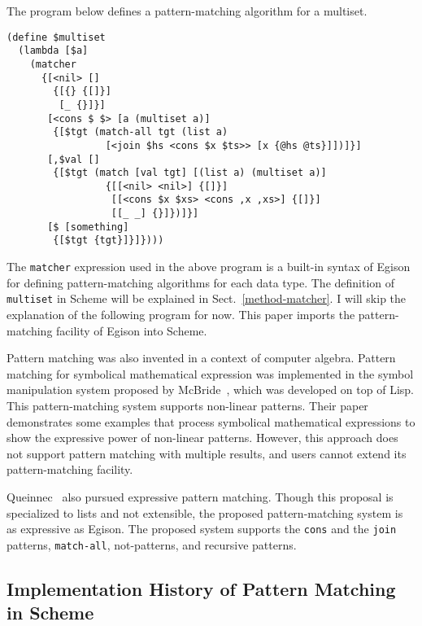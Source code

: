 \documentclass[acmlarge]{acmart}
\newcommand{\todo}[1]{\textcolor{red}{(TODO: #1)}}
\newcommand{\new}[1]{\textcolor{blue}{#1}}
\begin{document}
The program below defines a pattern-matching algorithm for a multiset.

\begin{lstlisting}[language=egison]
(define $multiset
  (lambda [$a]
    (matcher
      {[<nil> []
        {[{} {[]}]
         [_ {}]}]
       [<cons $ $> [a (multiset a)]
        {[$tgt (match-all tgt (list a)
                 [<join $hs <cons $x $ts>> [x {@hs @ts}]])]}]
       [,$val []
        {[$tgt (match [val tgt] [(list a) (multiset a)]
                 {[[<nil> <nil>] {[]}]
                  [[<cons $x $xs> <cons ,x ,xs>] {[]}]
                  [[_ _] {}]})]}]
       [$ [something]
        {[$tgt {tgt}]}]})))
\end{lstlisting}

\noindent
The \lstinline{matcher} expression used in the above program is a built-in syntax of Egison for defining pattern-matching algorithms for each data type.
The definition of \lstinline{multiset} in Scheme will be explained in Sect.~\ref{method-matcher}.
I will skip the explanation of the following program for now.
This paper imports the pattern-matching facility of Egison into Scheme.

\medskip

Pattern matching was also invented in a context of computer algebra.
Pattern matching for symbolical mathematical expression was implemented in the symbol manipulation system proposed by McBride~\cite{mcbride1969symbol}, which was developed on top of Lisp.
This pattern-matching system supports non-linear patterns.
Their paper demonstrates some examples that process symbolical mathematical expressions to show the expressive power of non-linear patterns.
However, this approach does not support pattern matching with multiple results, and users cannot extend its pattern-matching facility.

Queinnec~\cite{queinnec1990compilation} also pursued expressive pattern matching.
Though this proposal is specialized to lists and not extensible, the proposed pattern-matching system is as expressive as Egison.
The proposed system supports the \lstinline{cons} and the \lstinline{join} patterns, \lstinline{match-all}, not-patterns, and recursive patterns.


\subsection{Implementation History of Pattern Matching in Scheme}\label{history2}
\end{document}
